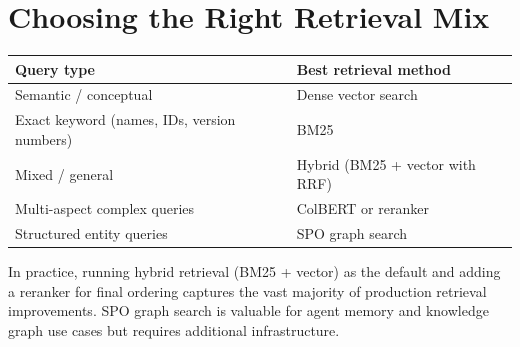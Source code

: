 \section{Choosing the Right Retrieval Mix}

\begin{center}
\begin{tabular}{ll}
\toprule
\textbf{Query type} & \textbf{Best retrieval method} \\
\midrule
Semantic / conceptual & Dense vector search \\
Exact keyword (names, IDs, version numbers) & BM25 \\
Mixed / general & Hybrid (BM25 + vector with RRF) \\
Multi-aspect complex queries & ColBERT or reranker \\
Structured entity queries & SPO graph search \\
\bottomrule
\end{tabular}
\end{center}

In practice, running hybrid retrieval (BM25 + vector) as the default and adding a reranker
for final ordering captures the vast majority of production retrieval improvements. SPO graph
search is valuable for agent memory and knowledge graph use cases but requires additional
infrastructure.
